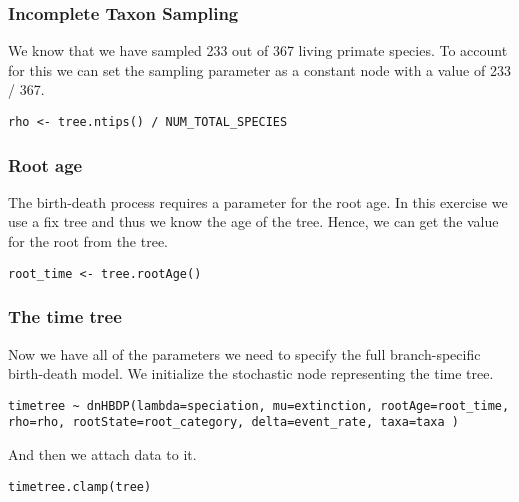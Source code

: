 \subsubsection{Incomplete Taxon Sampling}

We know that we have sampled 233 out of 367 living primate species.
To account for this we can set the sampling parameter as a constant node with a value of 233 / 367.
{\tt \begin{snugshade*}
\begin{lstlisting}
rho <- tree.ntips() / NUM_TOTAL_SPECIES
\end{lstlisting}
\end{snugshade*}}


\subsubsection{Root age}

The birth-death process requires a parameter for the root age.
In this exercise we use a fix tree and thus we know the age of the tree.
Hence, we can get the value for the root from the \citet{MagnusonFord2012} tree.
{\tt \begin{snugshade*}
\begin{lstlisting}
root_time <- tree.rootAge()
\end{lstlisting}
\end{snugshade*}}

\subsubsection{The time tree}

Now we have all of the parameters we need to specify the full branch-specific birth-death model.
We initialize the stochastic node representing the time tree.
{\tt \begin{snugshade*}
\begin{lstlisting}
timetree ~ dnHBDP(lambda=speciation, mu=extinction, rootAge=root_time, rho=rho, rootState=root_category, delta=event_rate, taxa=taxa )
\end{lstlisting}
\end{snugshade*}}
And then we attach data to it.
{\tt \begin{snugshade*}
\begin{lstlisting}
timetree.clamp(tree)
\end{lstlisting}
\end{snugshade*}}

